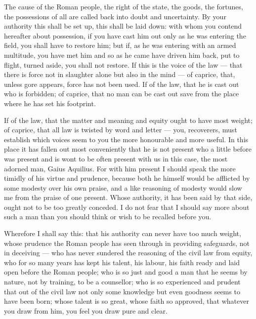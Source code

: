  The cause of the Roman people, the right of the state, the goods, the fortunes, the possessions of all are called back into doubt and uncertainty. By your authority this shall be set up, this shall be laid down: with whom you contend hereafter about possession, if you have cast him out only as he was entering the field, you shall have to restore him; but if, as he was entering with an armed multitude, you have met him and so as he came have driven him back, put to flight, turned aside, you shall not restore. If this is the voice of the law --- that there is force not in slaughter alone but also in the mind --- of caprice, that, unless gore appears, force has not been used. If of the law, that he is cast out who is forbidden; of caprice, that no man can be cast out save from the place where he has set his footprint.

 If of the law, that the matter and meaning and equity ought to have most weight; of caprice, that all law is twisted by word and letter --- you, recoverers, must establish which voices seem to you the more honourable and more useful. In this place it has fallen out most conveniently that he is not present who a little before was present and is wont to be often present with us in this case, the most adorned man, Gaius Aquilius. For with him present I should speak the more timidly of his virtue and prudence, because both he himself would be afflicted by some modesty over his own praise, and a like reasoning of modesty would slow me from the praise of one present. Whose authority, it has been said by that side, ought not to be too greatly conceded. I do not fear that I should say more about such a man than you should think or wish to be recalled before you.

 Wherefore I shall say this: that his authority can never have too much weight, whose prudence the Roman people has seen through in providing safeguards, not in deceiving --- who has never sundered the reasoning of the civil law from equity, who for so many years has kept his talent, his labour, his faith ready and laid open before the Roman people; who is so just and good a man that he seems by nature, not by training, to be a counsellor; who is so experienced and prudent that out of the civil law not only some knowledge but even goodness seems to have been born; whose talent is so great, whose faith so approved, that whatever you draw from him, you feel you draw pure and clear.

